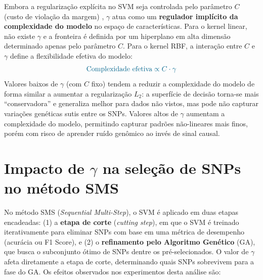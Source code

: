 \documentclass[
    12pt,
    a4paper,
    oneside,
    english,
    french,
    spanish,
    brazil
    ]{abntex2}
\newcommand{\novo}[1]{\textcolor{corNova}{#1}}
\begin{document}
\novo{Embora a regularização explícita no SVM seja controlada pelo parâmetro $C$ (custo de violação da margem) \cite{smola2004tutorial}, $\gamma$ atua como um \textbf{regulador implícito da complexidade do modelo} no espaço de características. Para o kernel linear, não existe $\gamma$ e a fronteira é definida por um hiperplano em alta dimensão determinado apenas pelo parâmetro $C$. Para o kernel RBF, a interação entre $C$ e $\gamma$ define a flexibilidade efetiva do modelo:}
\begin{equation}
  \novo{\text{Complexidade efetiva} \propto C \cdot \gamma}
  \label{eq:complexidade}
\end{equation}
\novo{Valores baixos de $\gamma$ (com $C$ fixo) tendem a reduzir a complexidade do modelo de forma similar a aumentar a regularização $L_2$: a superfície de decisão torna-se mais ``conservadora'' e generaliza melhor para dados não vistos, mas pode não capturar variações genéticas sutis entre os SNPs. Valores altos de $\gamma$ aumentam a complexidade do modelo, permitindo capturar padrões não-lineares mais finos, porém com risco de aprender ruído genômico ao invés de sinal causal.}

\section*{Impacto de $\gamma$ na seleção de SNPs no método SMS}

\novo{No método SMS (\textit{Sequential Multi-Step}), o SVM é aplicado em duas etapas encadeadas: (1) a \textbf{etapa de corte} (\textit{cutting step}), em que o SVM é treinado iterativamente para eliminar SNPs com base em uma métrica de desempenho (acurácia ou F1 Score), e (2) o \textbf{refinamento pelo Algoritmo Genético} (GA), que busca o subconjunto ótimo de SNPs dentre os pré-selecionados. O valor de $\gamma$ afeta diretamente a etapa de corte, determinando quais SNPs sobrevivem para a fase do GA. Os efeitos observados nos experimentos desta análise são:}
\end{document}
